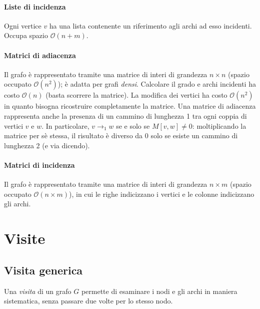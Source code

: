 \documentclass[11pt]{book}
\begin{document}
\subsubsection{Liste di incidenza}
Ogni vertice $v$ ha una lista contenente un riferimento agli archi ad esso incidenti. Occupa spazio $\mathcal{O}(n+m)$.
\subsubsection{Matrici di adiacenza}
Il grafo è rappresentato tramite una matrice di interi di grandezza $n \times n$ (spazio occupato $\mathcal{O}(n^2)$); è 
adatta per grafi \textit{densi}. Calcolare il grado e archi incidenti ha costo $\mathcal{O}(n)$ (basta scorrere la matrice). 
La modifica dei vertici ha costo $\mathcal{O}(n^2)$ in quanto bisogna ricostruire completamente la matrice.
Una matrice di adiacenza rappresenta anche la presenza di un cammino di lunghezza 1 tra ogni coppia di vertici $v$ e $w$. 
In particolare, $v \rightarrow_1 w$ se e solo se $M[v,w]\neq 0$: moltiplicando la matrice per sè stessa, il risultato è 
diverso da 0 solo se esiste un cammino di lunghezza 2 (e via dicendo).
\subsubsection{Matrici di incidenza}
Il grafo è rappresentato tramite una matrice di interi di grandezza $n \times m$ (spazio occupato $\mathcal{O}(n \times m)$), 
in cui le righe indicizzano i vertici e le colonne indicizzano gli archi.
\chapter{Visite}
\section{Visita generica}
Una \textit{visita} di un grafo $G$ permette di esaminare i nodi e gli archi in maniera sistematica, senza passare due 
volte per lo stesso nodo.
\end{document}
